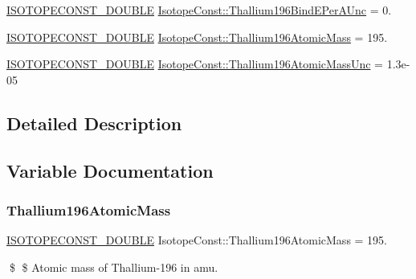 \begin{DoxyCompactItemize}
\mbox{\hyperlink{group___isotope_const-_macros_ga8f45a7272ce02c0b4c65c44636ed719a}{I\+S\+O\+T\+O\+P\+E\+C\+O\+N\+S\+T\+\_\+\+D\+O\+U\+B\+LE}} \mbox{\hyperlink{group___isotope_const-_thallium-_tl196_ga0815b537f8cc77bed01711b7e6e9f3bf}{Isotope\+Const\+::\+Thallium196\+Bind\+E\+Per\+A\+Unc}} = 0.
\item 
\mbox{\hyperlink{group___isotope_const-_macros_ga8f45a7272ce02c0b4c65c44636ed719a}{I\+S\+O\+T\+O\+P\+E\+C\+O\+N\+S\+T\+\_\+\+D\+O\+U\+B\+LE}} \mbox{\hyperlink{group___isotope_const-_thallium-_tl196_gada2a1e0450d4209a51143680703a805a}{Isotope\+Const\+::\+Thallium196\+Atomic\+Mass}} = 195.
\item 
\mbox{\hyperlink{group___isotope_const-_macros_ga8f45a7272ce02c0b4c65c44636ed719a}{I\+S\+O\+T\+O\+P\+E\+C\+O\+N\+S\+T\+\_\+\+D\+O\+U\+B\+LE}} \mbox{\hyperlink{group___isotope_const-_thallium-_tl196_gacc9bf1d0b80958317eca70afbcd2b276}{Isotope\+Const\+::\+Thallium196\+Atomic\+Mass\+Unc}} = 1.\+3e-\/05
\end{DoxyCompactItemize}


\subsection{Detailed Description}


\subsection{Variable Documentation}
\mbox{\label{group___isotope_const-_thallium-_tl196_gada2a1e0450d4209a51143680703a805a}} 
\subsubsection{\texorpdfstring{Thallium196\+Atomic\+Mass}{Thallium196AtomicMass}}
{\footnotesize\ttfamily \mbox{\hyperlink{group___isotope_const-_macros_ga8f45a7272ce02c0b4c65c44636ed719a}{I\+S\+O\+T\+O\+P\+E\+C\+O\+N\+S\+T\+\_\+\+D\+O\+U\+B\+LE}} Isotope\+Const\+::\+Thallium196\+Atomic\+Mass = 195.}

\$ \$ Atomic mass of Thallium-\/196 in amu. \mbox{\label{group___isotope_const-_thallium-_tl196_gacc9bf1d0b80958317eca70afbcd2b276}} 
